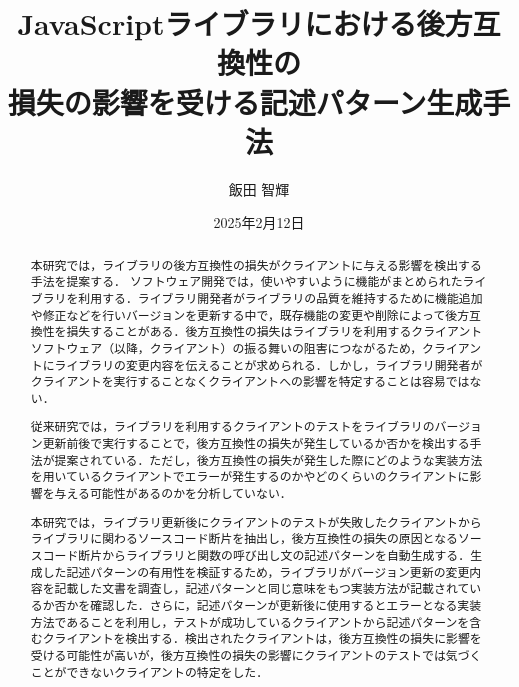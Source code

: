 \documentclass[11pt]{jreport}
\title{JavaScriptライブラリにおける後方互換性の\\損失の影響を受ける記述パターン生成手法}
\author{飯田 智輝}
\date{2025年2月12日}	%
\begin{document}
\maketitle

\begin{abstract}
本研究では，ライブラリの後方互換性の損失がクライアントに与える影響を検出する手法を提案する．
ソフトウェア開発では，使いやすいように機能がまとめられたライブラリを利用する．ライブラリ開発者がライブラリの品質を維持するために機能追加や修正などを行いバージョンを更新する中で，既存機能の変更や削除によって後方互換性を損失することがある．後方互換性の損失はライブラリを利用するクライアントソフトウェア（以降，クライアント）の振る舞いの阻害につながるため，クライアントにライブラリの変更内容を伝えることが求められる．しかし，ライブラリ開発者がクライアントを実行することなくクライアントへの影響を特定することは容易ではない．

従来研究では，ライブラリを利用するクライアントのテストをライブラリのバージョン更新前後で実行することで，後方互換性の損失が発生しているか否かを検出する手法が提案されている．ただし，後方互換性の損失が発生した際にどのような実装方法を用いているクライアントでエラーが発生するのかやどのくらいのクライアントに影響を与える可能性があるのかを分析していない．

本研究では，ライブラリ更新後にクライアントのテストが失敗したクライアントからライブラリに関わるソースコード断片を抽出し，後方互換性の損失の原因となるソースコード断片からライブラリと関数の呼び出し文の記述パターンを自動生成する．生成した記述パターンの有用性を検証するため，ライブラリがバージョン更新の変更内容を記載した文書を調査し，記述パターンと同じ意味をもつ実装方法が記載されているか否かを確認した．さらに，記述パターンが更新後に使用するとエラーとなる実装方法であることを利用し，テストが成功しているクライアントから記述パターンを含むクライアントを検出する．検出されたクライアントは，後方互換性の損失に影響を受ける可能性が高いが，後方互換性の損失の影響にクライアントのテストでは気づくことができないクライアントの特定をした．
\end{abstract}

\tableofcontents

\end{document}
